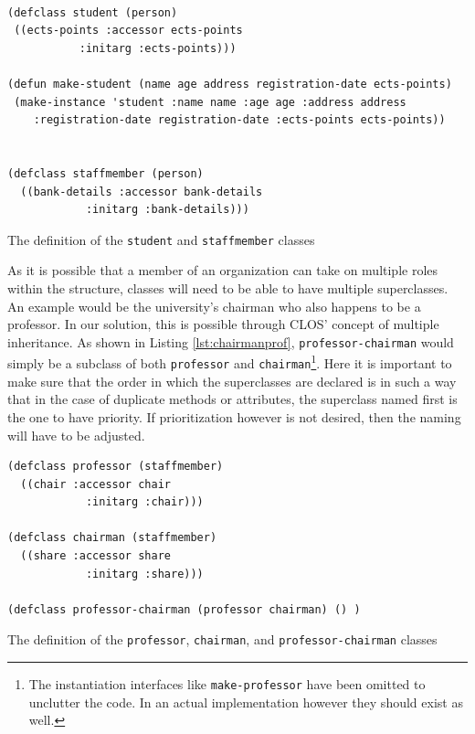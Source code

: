 \documentclass[oribibl]{llncs}
\begin{document}
\begin{listing}[]%
 \centering
\begin{verbatim}

(defclass student (person)
 ((ects-points :accessor ects-points
           :initarg :ects-points)))

(defun make-student (name age address registration-date ects-points)
 (make-instance 'student :name name :age age :address address
    :registration-date registration-date :ects-points ects-points))
    
    
(defclass staffmember (person)
  ((bank-details :accessor bank-details
            :initarg :bank-details)))

\end{verbatim}
\caption{The definition of the \texttt{student} and \texttt{staffmember} classes}
\label{lst:student}
\end{listing}



As it is possible that a member of an organization can take on multiple roles within the structure, classes will need to be able to have multiple superclasses. An example would be the university's chairman who also happens to be a professor. In our solution, this is possible through CLOS' concept of multiple inheritance. As shown in Listing \ref{lst:chairmanprof}, \texttt{professor-chairman} would simply be a subclass of both \texttt{professor} and \texttt{chairman}\footnote{The instantiation interfaces like \texttt{make-professor} have been omitted to unclutter the code. In an actual implementation however they should exist as well.}. Here it is important to make sure that the order in which the superclasses are declared is in such a way that in the case of duplicate methods or attributes, the superclass named first is the one to have priority. If prioritization however is not desired, then the naming will have to be adjusted.

\begin{listing}[]%
 \centering
\begin{verbatim}
(defclass professor (staffmember)
  ((chair :accessor chair
            :initarg :chair)))

(defclass chairman (staffmember)
  ((share :accessor share
            :initarg :share)))

(defclass professor-chairman (professor chairman) () )

\end{verbatim}
\caption{The definition of the \texttt{professor}, \texttt{chairman}, and \texttt{professor-chairman} classes}
\label{lst:chairmanprof}
\end{listing}
\end{document}
